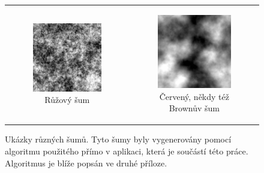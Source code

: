 \begin{figure}[h!]
\begin{tabular}{cc}
\begin{subfigure}{0.45\textwidth}
  \centering
  \includegraphics[width=.8\linewidth]{img/pink_noise}
  \caption{Růžový šum} 
\end{subfigure}&
\begin{subfigure}{0.45\textwidth}
  \centering
  \includegraphics[width=.8\linewidth]{img/brown_noise}
  \caption{Červený, někdy též Brownův šum} 
\end{subfigure}%
\end{tabular} 
\caption{Ukázky různých šumů. Tyto šumy byly vygenerovány pomocí algoritmu použitého přímo v aplikaci, která je součástí této práce. Algoritmus je blíže popsán ve druhé příloze.} 
\label{obr:noise:example} 
 
\end{figure}
